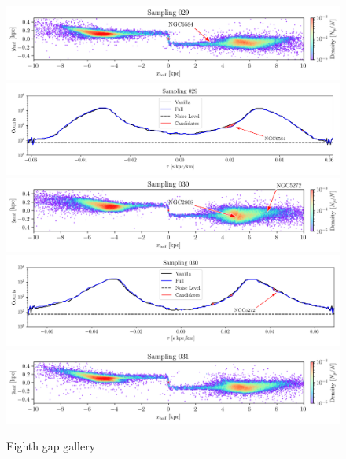 \documentclass[draft]{aa}
\begin{document}
\begin{appendix}
    \begin{figure}
      \centering      
      \includegraphics[width=\linewidth]{gallery_of_gaps_monte-carlo-029.png}    
      \includegraphics[width=\linewidth]{tau-profile-monte-carlo-029.png}  
      \includegraphics[width=\linewidth]{gallery_of_gaps_monte-carlo-030.png}
      \includegraphics[width=\linewidth]{tau-profile-monte-carlo-030.png}
      \includegraphics[width=\linewidth]{gallery_of_gaps_monte-carlo-031.png}
      \caption{Eighth gap gallery}
      \label{fig:gallery7}
      \end{figure}        



\end{appendix}
\end{document}
